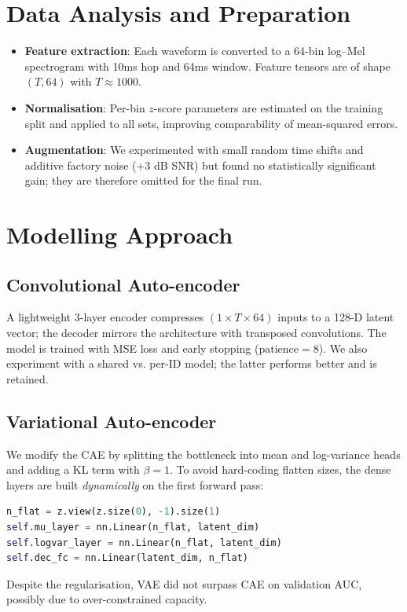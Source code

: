 \documentclass[11pt,a4paper]{article}
\begin{document}
\section{Data Analysis and Preparation}
\begin{itemize}
\item \textbf{Feature extraction}: Each waveform is converted to a 64-bin log–Mel spectrogram with 10ms hop and 64ms window.  Feature tensors are of shape $(T,64)$ with $T\approx1000$.
\item \textbf{Normalisation}: Per-bin $z$-score parameters are estimated on the training split and applied to all sets, improving comparability of mean-squared errors.
\item \textbf{Augmentation}: We experimented with small random time shifts and additive factory noise (+3 dB SNR) but found no statistically significant gain; they are therefore omitted for the final run.
\end{itemize}

\section{Modelling Approach}
\subsection{Convolutional Auto-encoder}
A lightweight 3-layer encoder compresses $(1\times T\times64)$ inputs to a 128-D latent vector; the decoder mirrors the architecture with transposed convolutions.  The model is trained with MSE loss and early stopping ($\text{patience}=8$).  We also experiment with a shared vs. per-ID model; the latter performs better and is retained.

\subsection{Variational Auto-encoder}
We modify the CAE by splitting the bottleneck into mean and log-variance heads and adding a KL term with $\beta=1$.  To avoid hard-coding flatten sizes, the dense layers are built \emph{dynamically} on the first forward pass:\newline
\begin{lstlisting}[language=Python]
n_flat = z.view(z.size(0), -1).size(1)
self.mu_layer = nn.Linear(n_flat, latent_dim)
self.logvar_layer = nn.Linear(n_flat, latent_dim)
self.dec_fc = nn.Linear(latent_dim, n_flat)
\end{lstlisting}
Despite the regularisation, VAE did not surpass CAE on validation AUC, possibly due to over-constrained capacity.
\end{document}
